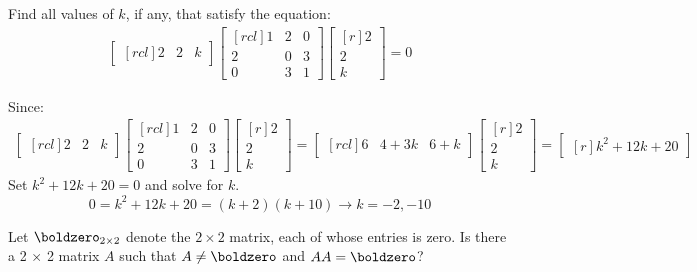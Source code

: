 \ii Find all values of $k$, if any, that satisfy the equation:
\newline
\begin{eqnarray*}
\begin{bmatrix}[rcl]
2&2&k
\end{bmatrix}
\begin{bmatrix}[rcl]
1&2&0\\
2&0&3\\
0&3&1
\end{bmatrix}
\begin{bmatrix}[r]
2\\
2\\
k
\end{bmatrix}
= 0
\end{eqnarray*}

\begin{solution} Since:
\begin{eqnarray*}
\begin{bmatrix}[rcl]
2&2&k
\end{bmatrix}
\begin{bmatrix}[rcl]
1&2&0\\
2&0&3\\
0&3&1
\end{bmatrix}
\begin{bmatrix}[r]
2\\
2\\
k
\end{bmatrix}
= 
\begin{bmatrix}[rcl]
6&4+3k&6+k
\end{bmatrix}
\begin{bmatrix}[r]
2\\
2\\
k
\end{bmatrix}
=
\begin{bmatrix}[r]
k^2 + 12k + 20
\end{bmatrix}
\end{eqnarray*}
Set $k^2 + 12k + 20 = 0$ and solve for $k$.
$$0 = k^2 + 12k + 20 = (k + 2)(k + 10) \rightarrow k = -2, -10$$
\end{solution}

\ii Let $\boldzero_{2\times 2}$ denote the  $2 \times 2$ matrix, each of whose entries is zero.
\bb
\ii Is there a 2 $\times$ 2 matrix $A$ such that $A \neq \boldzero$ and $AA = \boldzero$?


